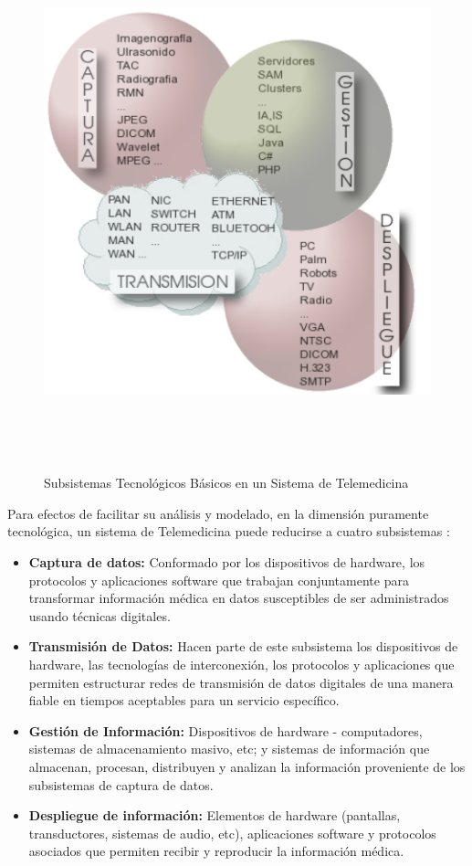\begin{figure}
 \centering
 \includegraphics[width=156mm, height=156mm]{red_1.png}
 \caption{Subsistemas Tecnológicos Básicos en un Sistema de Telemedicina}
 \label{subsistemas}
\end{figure}


Para efectos de facilitar su análisis y modelado, en la dimensión puramente tecnológica, un sistema de Telemedicina puede reducirse a cuatro subsistemas \cite{aparicio2003}:

\begin{itemize}
 \item \textbf{Captura de datos:} Conformado por los dispositivos de hardware, los protocolos y aplicaciones software que trabajan conjuntamente para transformar información médica en datos susceptibles de ser administrados usando técnicas digitales.
 \item \textbf{Transmisión de Datos:} Hacen parte de este subsistema los dispositivos de hardware, las tecnologías de interconexión, los protocolos y aplicaciones que permiten estructurar redes de transmisión de datos digitales de una manera fiable en tiempos aceptables para un servicio específico.
 \item \textbf{Gestión de Información:} Dispositivos de hardware - computadores, sistemas de almacenamiento masivo, etc; y  sistemas de información que almacenan, procesan, distribuyen y analizan la información proveniente de los subsistemas de captura de datos.
 \item \textbf{Despliegue de información:} Elementos de hardware (pantallas, transductores, sistemas de audio, etc), aplicaciones software y protocolos asociados que permiten recibir y reproducir la información médica. 
\end{itemize}

